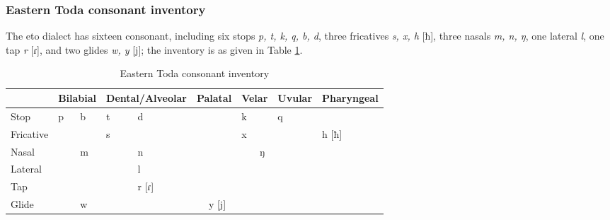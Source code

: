 \subsubsection{Eastern Toda consonant inventory}

The \acl{eto} dialect has sixteen consonant, including six stops \textit{p, t, k, q, b, d}, three fricatives \textit{s, x, h} [ħ], three nasals \textit{m, n, ŋ}, one lateral \textit{l}, one tap \textit{r} [ɾ], and two glides \textit{w, y} [j]; the inventory is as given in Table \ref{tab:etoC}.

\begin{table}[!htbp]
\centering
\caption{Eastern Toda consonant inventory}
\label{tab:etoC}
\begin{tabular}{l|ll|ll|ll|ll|ll|ll}
\hline
                    & \multicolumn{2}{c|}{Bilabial} & \multicolumn{2}{c|}{Dental/Alveolar} & \multicolumn{2}{c|}{Palatal} & \multicolumn{2}{c|}{Velar} & \multicolumn{2}{c|}{Uvular} & \multicolumn{2}{c}{Pharyngeal} \\ \hline
Stop                & p            & b           & t \quad\quad\quad          & d               &             &               & k          &            & q            &            &                 &              \\
Fricative           &               &              & s               &                  &             &               & x          &             &               &            & h [ħ]             &              \\
Nasal               &               & m           &                  & n               &             &               &             & ŋ          &               &            &                 &              \\
Lateral &               &              &                  & l               &             &               &             &             &               &            &                 &              \\
Tap                 &               &              &                  & r [ɾ]              &             &               &             &             &               &            &                 &              \\
Glide               &               & w           &                  &                  &             & y [j]           &             &             &               &            &                 &              \\ \hline
\end{tabular}
\end{table}

